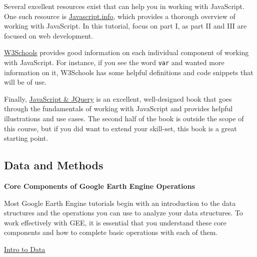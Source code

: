 \documentclass[
]{article}
\begin{document}
Several excellent resources exist that can help you in working with JavaScript. One such resource is \href{https://javascript.info}{Javascript.info}, which provides a thorough overview of working with JavaScript. In this tutorial, focus on part I, as part II and III are focused on web development.

\href{https://www.w3schools.com/js/default.asp}{W3Schools} provides good information on each individual component of working with JavaScript. For instance, if you see the word \texttt{var} and wanted more information on it, W3Schools has some helpful definitions and code snippets that will be of use.

Finally, \href{http://www.javascriptbook.com}{JavaScript \& JQuery} is an excellent, well-designed book that goes through the fundamentals of working with JavaScript and provides helpful illustrations and use cases. The second half of the book is outside the scope of this course, but if you did want to extend your skill-set, this book is a great starting point.

\hypertarget{data-and-methods}{%
\subsection{Data and Methods}\label{data-and-methods}}

\textbf{Core Components of Google Earth Engine Operations}

Most Google Earth Engine tutorials begin with an introduction to the data structures and the operations you can use to analyze your data structures. To work effectively with GEE, it is essential that you understand these core components and how to complete basic operations with each of them.

\href{https://developers.google.com/earth-engine/guides}{Intro to Data}
\end{document}
